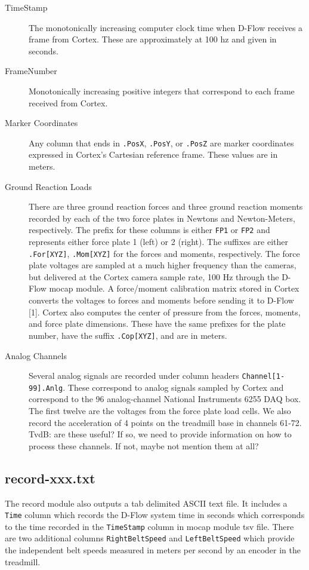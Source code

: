 \documentclass[10pt,a4paper,twocolumn]{article}
\begin{document}
\begin{description}
  \item[TimeStamp] The monotonically increasing computer clock time when D-Flow
    receives a frame from Cortex. These are approximately at 100 hz and given
    in seconds.
  \item[FrameNumber] Monotonically increasing positive integers that correspond
    to each frame received from Cortex.
  \item[Marker Coordinates] Any column that ends in \verb+.PosX+, \verb+.PosY+,
    or \verb+.PosZ+ are marker coordinates expressed in Cortex's Cartesian
    reference frame. These values are in meters.
  \item[Ground Reaction Loads] There are three ground reaction forces and three
    ground reaction moments recorded by each of the two force plates in Newtons
    and Newton-Meters, respectively. The prefix for these columns is either
    \verb+FP1+ or \verb+FP2+ and represents either force plate 1 (left) or 2
    (right). The suffixes are either \verb+.For[XYZ]+, \verb+.Mom[XYZ]+ for the
    forces and moments, respectively. The force plate voltages are sampled at a
    much higher frequency than the cameras, but delivered at the Cortex camera
    sample rate, 100 Hz through the D-Flow mocap module. A force/moment
    calibration matrix stored in Cortex converts the voltages to forces and
    moments before sending it to D-Flow [1]. Cortex also computes the center of
    pressure from the forces, moments, and force plate dimensions. These have
    the same prefixes for the plate number, have the suffix \verb+.Cop[XYZ]+,
    and are in meters.
  \item[Analog Channels] Several analog signals are recorded under column
    headers \verb+Channel[1-99].Anlg+. These correspond to analog signals
    sampled by Cortex and correspond to the 96 analog-channel National
    Instruments 6255 DAQ box. The first twelve are the voltages from the
    force plate load cells. We also record the acceleration of 4 points on the
    treadmill base in channels 61-72.  TvdB: are these useful?  If so, we need to
    provide information on how to process these channels. If not, maybe
    not mention them at all?
\end{description}

\subsection*{record-xxx.txt}
%
The record module also outputs a tab delimited ASCII text file. It includes a
\verb+Time+ column which records the D-Flow system time in seconds which
corresponds to the time recorded in the \verb+TimeStamp+ column in mocap module
tsv file. There are two additional columns \verb+RightBeltSpeed+ and
\verb+LeftBeltSpeed+ which provide the independent belt speeds measured in
meters per second by an encoder in the treadmill.
\end{document}
